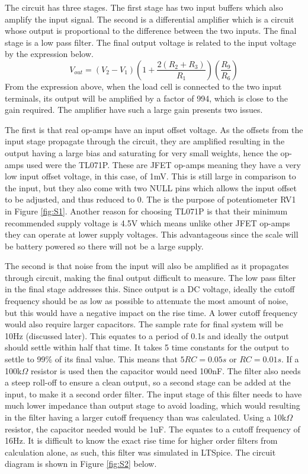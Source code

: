 \documentclass[class=report,11pt,crop=false]{standalone}
\begin{document}
	The circuit has three stages. The first stage has two input buffers which also amplify the input signal. The second is a differential amplifier which is a circuit whose output is proportional to the difference between the two inputs. The final stage is a low pass filter. The final output voltage is related to the input voltage by the expression below.
	\[V_{out} = (V_2 - V_1) \left(1 + \frac{2(R_2+R_3)}{R_1}\right) \left(\frac{R_9}{R_6}\right) \]
	From the expression above, when the load cell is connected to the two input terminals, its output will be amplified by a factor of 994, which is close to the gain required. 
	The amplifier have such a large gain presents two issues.
	
	The first is that real op-amps have an input offset voltage. As the offsets from the input stage propagate through the circuit, they are amplified resulting in the output having a large bias and saturating for very small weights, hence the op-amps used were the TL071P. These are JFET op-amps meaning they have a very low input offset voltage, in this case, of 1mV. This is still large in comparison to the input, but they also come with two NULL pins which allows the input offset to be adjusted, and thus reduced to 0. The is the purpose of potentiometer RV1 in Figure \ref{fig:S1}. Another reason for choosing TL071P is that their minimum recommended supply voltage is 4.5V which means unlike other JFET op-amps they can operate at lower supply voltages. This advantageous since the scale will be battery powered so there will not be a large supply.
	
	The second is that noise from the input will also be amplified as it propagates through circuit, making the final output difficult to measure. The low pass filter in the final stage addresses this. Since output is a DC voltage, ideally the cutoff frequency should be as low as possible to attenuate the most amount of noise, but this would have a negative impact on the rise time. A lower cutoff frequency would also require larger capacitors. The sample rate for final system will be 10Hz (discussed later). This equates to a period of 0.1s and ideally the output should settle within half that time. It takes 5 time constants for the output to settle to 99\% of its final value. This means that $5RC = 0.05s$ or $RC = 0.01s$. If a 100k$\Omega$ resistor is used then the capacitor would need 100nF. The filter also needs a steep roll-off to ensure a clean output, so a second stage can be added at the input, to make it a second order filter. The input stage of this filter needs to have much lower impedance than output stage to avoid loading, which would resulting in the filter having a larger cutoff frequency than was calculated. Using a 10k$\Omega$ resistor, the capacitor needed would be 1uF. The equates to a cutoff frequency of 16Hz. It is difficult to know the exact rise time for higher order filters from calculation alone, as such, this filter was simulated in LTSpice. The circuit diagram is shown in Figure \ref{fig:S2} below.
	
\end{document}

